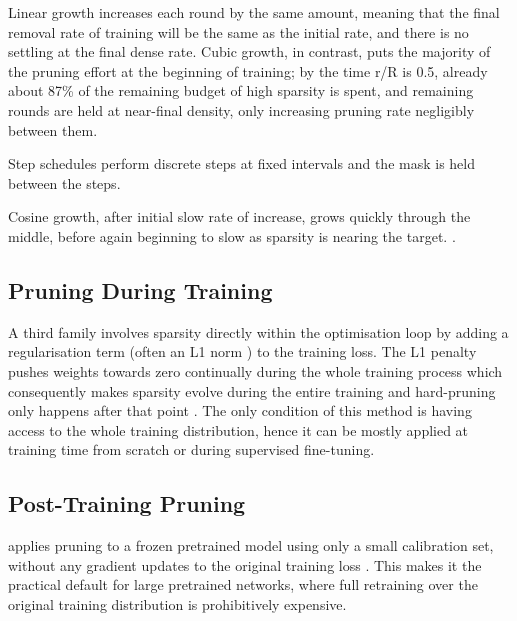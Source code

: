 Linear growth increases each round by the same amount, meaning that the final removal rate of training will be the same as the initial rate, and there is no settling at the final dense rate.
Cubic growth, in contrast, puts the majority of the pruning effort at the beginning of training; by the time r/R is 0.5, already about 87\% of the remaining budget of high sparsity is spent, and remaining rounds are held at near-final density, only increasing pruning rate negligibly between them.

Step schedules perform discrete steps at fixed intervals and the mask is held between the steps.

Cosine growth, after initial slow rate of increase, grows quickly through the middle, before again beginning to slow as sparsity is nearing the target. \cite{zhu2018prune}.

\subsection{Pruning During Training}
\label{subsec:pruning_during_training}

A third family involves sparsity directly within the optimisation loop by adding a regularisation term (often an L1 norm \cite{liu2017learning}) to the training loss. The L1 penalty pushes weights towards zero continually during the whole training process which consequently makes sparsity evolve during the entire training and hard-pruning only happens after that point \cite{han2015deep,guo2016dynamic}. The only condition of this method is having access to the whole training distribution, hence it can be mostly applied at training time from scratch or during supervised fine-tuning.

\subsection{Post-Training Pruning}
\label{sec:post_training_pruning}

 applies pruning to a frozen pretrained model
using only a small calibration set, without any gradient updates to the
original training loss \cite{frantar2023sparsegpt}. This makes it the
practical default for large pretrained networks, where full retraining over
the original training distribution is prohibitively expensive.

